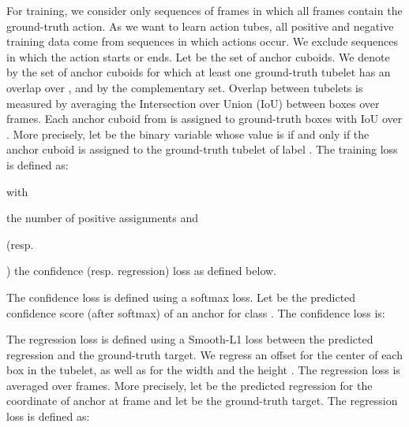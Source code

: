 \documentclass[10pt,twocolumn,letterpaper]{article}
\begin{document}
For training, we consider only sequences of frames in which all frames contain the ground-truth action. As we want to learn action tubes, all positive and negative training data come from sequences in which actions occur. 
We exclude sequences in which the action starts or ends. Let  be the set of anchor cuboids. We denote by  the set of anchor cuboids for which at least one ground-truth tubelet has an overlap over , and by  the complementary set. Overlap between tubelets is measured by averaging the Intersection over Union (IoU) between boxes over  frames. 
Each anchor cuboid from  is assigned to ground-truth boxes with IoU over . More precisely, let  be the binary variable
whose value is  if and only if the anchor cuboid  is assigned to the ground-truth tubelet  of label .
The training loss  is defined as:
\begin{small}
\vspace{0.6mm}

\vspace{-5.3mm}
\end{small}
\noindent with \begin{small} \end{small} the number of positive assignments and \begin{small}  \end{small} (resp.\, \begin{small} \end{small}) the confidence (resp. regression) loss as defined below.

The confidence loss is defined using a softmax loss. Let  be the predicted confidence score (after softmax) of an anchor  for class . The confidence loss is:

\begin{small}
\vspace{0mm}

\vspace{-1mm}
\end{small}

The regression loss is defined using a Smooth-L1 loss between the predicted regression and the ground-truth target. We regress an offset for the center  of each box in the tubelet, as well as for the width  and the height . The regression loss is averaged over  frames. 
More precisely, let  be the predicted regression for the  coordinate of anchor  at frame  and let  be the ground-truth target. The regression loss is defined as:

\begin{footnotesize}
\vspace{-4mm}

\vspace{-2mm}
\end{footnotesize}
\end{document}
